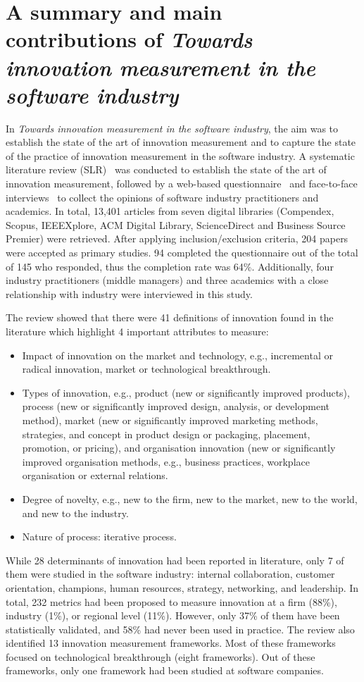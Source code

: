 \documentclass[sigconf,review]{acmart}
\newcommand{\theArticle}{\textit{Towards innovation measurement in the software industry}}
\begin{document}
\section{A summary and main contributions of \theArticle} %
\label{sec:sumpaper}
In \theArticle, the aim was to establish the state of the art of innovation measurement and to capture the state of the practice of innovation measurement in the software industry. A systematic literature review (SLR)~\cite{kitchenham07} was conducted to establish the state of the art of innovation measurement, followed by a web-based questionnaire~\cite{kasunic05} and face-to-face interviews~\cite{creswell09} to collect the opinions of software industry practitioners and academics. In total, 13,401 articles from seven digital libraries (Compendex, Scopus, IEEEXplore, ACM Digital Library, ScienceDirect and Business Source Premier) were retrieved. After applying inclusion\slash exclusion criteria, 204 papers were accepted as primary studies. 94 completed the questionnaire out of the total of 145 who responded, thus the completion rate was 64\%. Additionally, four industry practitioners (middle managers) and three academics with a close relationship with industry were interviewed in this study. 

The review showed that there were 41 definitions of innovation found in the literature which highlight 4 important attributes to measure: 
\begin{itemize}
    \item Impact of innovation on the market and technology, e.g., incremental or radical innovation, market or technological breakthrough.
    \item Types of innovation, e.g., product (new or significantly improved products), process (new or significantly improved design, analysis, or development method), market (new or significantly improved marketing methods, strategies, and concept in product design or packaging, placement, promotion, or pricing), and organisation innovation (new or significantly improved organisation methods, e.g., business practices, workplace organisation or external relations.
    \item Degree of novelty, e.g., new to the firm, new to the market, new to the world, and new to the industry.
    \item Nature of process: iterative process.
\end{itemize}

While 28 determinants of innovation had been reported in literature, only 7 of them were studied in the software industry: internal collaboration, customer orientation, champions, human resources, strategy, networking, and leadership. In total, 232 metrics had been proposed to measure innovation at a firm (88\%), industry (1\%), or regional level (11\%). However, only 37\% of them have been statistically validated, and 58\% had never been used in practice. The review also identified 13 innovation measurement frameworks. Most of these frameworks focused on technological breakthrough (eight frameworks). Out of these frameworks, only one framework had been studied at software companies. 
\end{document}
